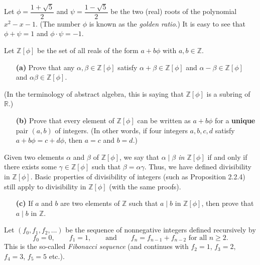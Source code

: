 \documentclass[paper=a4, fontsize=12pt]{scrartcl} %
\newcommand{\RR}{\mathbb{R}} %
\newcommand{\ZZ}{\mathbb{Z}} %
\newcommand{\tup}[1]{\left( #1 \right)}
\newcommand{\ive}[1]{\left[ #1 \right]}
\theoremstyle{plainsl}
\theoremstyle{definition}
\theoremstyle{remark}
\begin{document}
Let $\phi = \dfrac{1+\sqrt5}{2}$ and $\psi = \dfrac{1-\sqrt5}{2}$
be the two (real) roots of the polynomial $x^2 - x - 1$.
(The number $\phi$ is known as the \textit{golden ratio}.)
It is easy to see that $\phi + \psi = 1$ and $\phi \cdot \psi = -1$.

Let $\ZZ\ive{\phi}$ be the set of all reals of the form
$a + b \phi$ with $a, b \in \ZZ$.

\begin{enumerate}

\item[\textbf{(a)}]
Prove that any $\alpha, \beta \in \ZZ\ive{\phi}$ satisfy
$\alpha + \beta \in \ZZ\ive{\phi}$ and
$\alpha - \beta \in \ZZ\ive{\phi}$ and
$\alpha \beta \in \ZZ\ive{\phi}$.

\end{enumerate}

(In the terminology of abstract algebra, this is saying
that $\ZZ\ive{\phi}$ is a subring of $\RR$.)

\begin{enumerate}

\item[\textbf{(b)}]
Prove that every element of $\ZZ\ive{\phi}$ can be
written as $a + b \phi$ for a \textbf{unique} pair
$\tup{a, b}$ of integers.
(In other words, if four integers $a, b, c, d$
satisfy $a + b \phi = c + d \phi$, then $a = c$
and $b = d$.)

\end{enumerate}

Given two elements $\alpha$ and $\beta$ of $\ZZ\ive{\phi}$,
we say that \textit{$\alpha \mid \beta$ in $\ZZ\ive{\phi}$}
if and only if there exists some $\gamma \in \ZZ\ive{\phi}$
such that $\beta = \alpha \gamma$.
Thus, we have defined divisibility in $\ZZ\ive{\phi}$.
Basic properties of divisibility of integers (such as
Proposition 2.2.4) still apply
to divisibility in $\ZZ\ive{\phi}$ (with the same proofs).

\begin{enumerate}

\item[\textbf{(c)}]
If $a$ and $b$ are two elements of
$\ZZ$ such that $a \mid b$ in $\ZZ\ive{\phi}$,
then prove that $a \mid b$ in $\ZZ$.

\end{enumerate}

Let $\tup{f_0, f_1, f_2, \ldots}$ be the sequence of nonnegative
integers defined recursively by
\[
f_0 = 0, \qquad
f_1 = 1, \qquad \text{and} \qquad
f_n = f_{n-1} + f_{n-2} \text{ for all } n \geq 2 .
\]
This is the so-called \textit{Fibonacci sequence} (and continues
with $f_2 = 1$, $f_3 = 2$, $f_4 = 3$, $f_5 = 5$ etc.).
\end{document}
